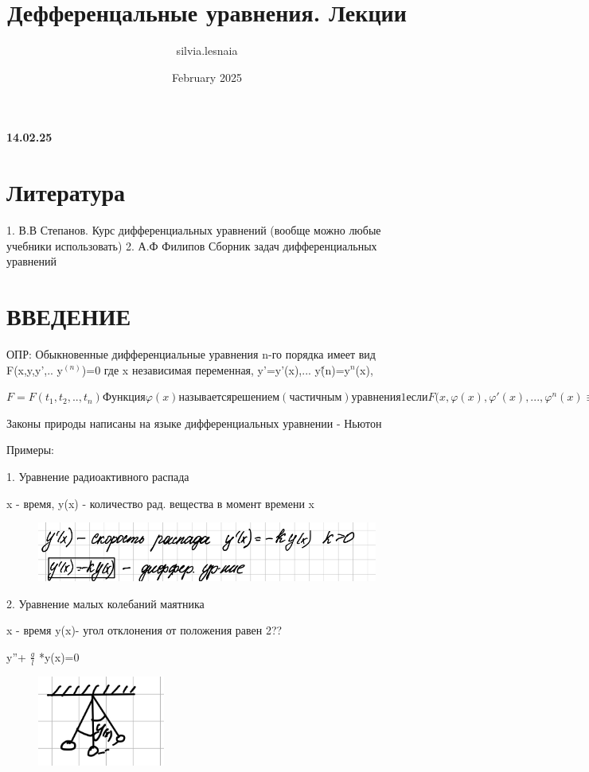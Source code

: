 \documentclass{article}
\title{Дефференцальные уравнения. Лекции}
\author{silvia.lesnaia }
\date{February 2025}
\begin{document}
\maketitle

\textbf{14.02.25}

\section{Литература}
1. В.В Степанов. Курс дифференциальных уравнений (вообще можно любые учебники использовать)
2. А.Ф Филипов Сборник задач дифференциальных уравнений 

\section{ВВЕДЕНИЕ}

ОПР: Обыкновенные дифференциальные уравнения n-го порядка имеет вид F(x,y,y',.. y$^(n)$)=0 где x независимая переменная, y'=y'(x),... y\^(n)=y$^n$(x),

$F=F(t_1,t_2,..,t_n) Функция \varphi (x) называется решением (частичным) уравнения 1 если  F (x, \varphi(x), \varphi'(x),..., \varphi^n (x)  \equiv 0 $


Законы природы написаны на языке дифференциальных уравнении - Ньютон

Примеры:

1. Уравнение радиоактивного распада

x - время, y(x) - количество рад. вещества в момент времени x

\begin{figure}[H]
    \centering
    \includegraphics[width=0.5\linewidth]{Снимок экрана 2025-02-14 101634.png}
\end{figure}

2. Уравнение малых колебаний маятника

x - время y(x)- угол отклонения от положения равен 2??

y''+ $\frac{g}{l}$ *y(x)=0

\begin{figure}[H]
    \centering
    \includegraphics[width=0.3\linewidth]{Снимок экрана 2025-02-14 102205.png}
\end{figure}
\end{document}
